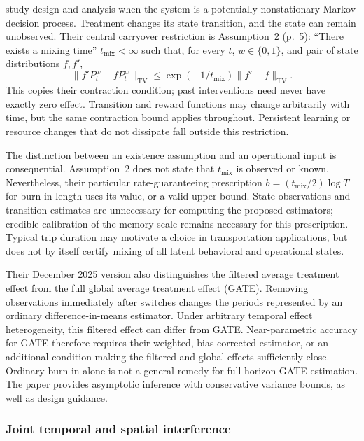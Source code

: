 \citet{huwager2025} study design and analysis when the system is a potentially nonstationary Markov decision process. Treatment changes its state transition, and the state can remain unobserved. Their central carryover restriction is Assumption~2 (p.~5): ``There exists a mixing time'' $t_{\mathrm{mix}}<\infty$ such that, for every $t$, $w\in\{0,1\}$, and pair of state distributions $f,f'$,
\begin{equation}
\label{eq:hw-mixing}
 \lVert f'P_t^w-fP_t^w\rVert_{\mathrm{TV}}
 \leq \exp(-1/t_{\mathrm{mix}})\lVert f'-f\rVert_{\mathrm{TV}}.
\end{equation}
This copies their contraction condition; past interventions need never have exactly zero effect. Transition and reward functions may change arbitrarily with time, but the same contraction bound applies throughout. Persistent learning or resource changes that do not dissipate fall outside this restriction.

The distinction between an existence assumption and an operational input is consequential. Assumption~2 does not state that $t_{\mathrm{mix}}$ is observed or known. Nevertheless, their particular rate-guaranteeing prescription $b=(t_{\mathrm{mix}}/2)\log T$ for burn-in length uses its value, or a valid upper bound. State observations and transition estimates are unnecessary for computing the proposed estimators; credible calibration of the memory scale remains necessary for this prescription. Typical trip duration may motivate a choice in transportation applications, but does not by itself certify mixing of all latent behavioral and operational states.

Their December 2025 version also distinguishes the filtered average treatment effect from the full global average treatment effect (GATE). Removing observations immediately after switches changes the periods represented by an ordinary difference-in-means estimator. Under arbitrary temporal effect heterogeneity, this filtered effect can differ from GATE. Near-parametric accuracy for GATE therefore requires their weighted, bias-corrected estimator, or an additional condition making the filtered and global effects sufficiently close. Ordinary burn-in alone is not a general remedy for full-horizon GATE estimation. The paper provides asymptotic inference with conservative variance bounds, as well as design guidance.

\subsubsection{Joint temporal and spatial interference}

